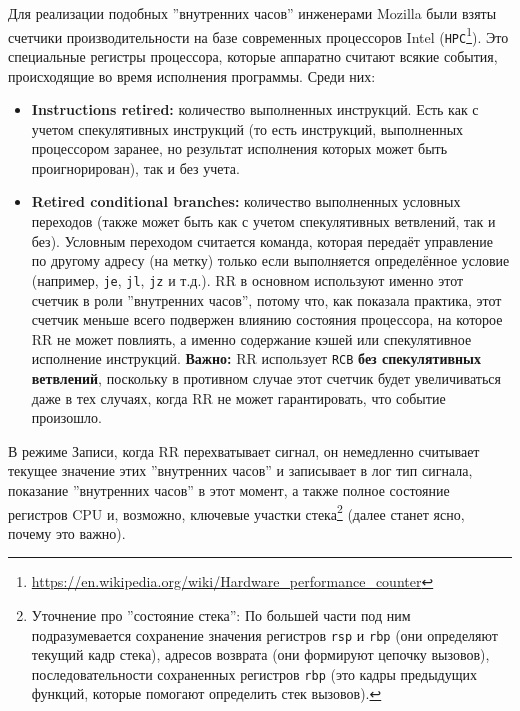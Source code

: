 Для реализации подобных ''внутренних часов'' инженерами Mozilla \cite{rr-paper}
были взяты счетчики производительности на базе современных процессоров Intel
(\texttt{HPC}\footnote{\url{https://en.wikipedia.org/wiki/Hardware_performance_counter}}).
Это специальные регистры процессора, которые аппаратно считают всякие события,
происходящие во время исполнения программы. Среди них:

\begin{itemize}

  \item \textbf{Instructions retired:} количество выполненных инструкций. Есть
  как с учетом спекулятивных инструкций (то есть инструкций, выполненных
  процессором заранее, но результат исполнения которых может быть
  проигнорирован), так и без учета.

  \item \textbf{Retired conditional branches:} количество выполненных условных
  переходов (также может быть как с учетом спекулятивных ветвлений, так и без).
  Условным переходом считается команда, которая передаёт управление по другому
  адресу (на метку) только если выполняется определённое условие (например,
  \texttt{je}, \texttt{jl}, \texttt{jz} и т.д.). RR в основном используют
  именно этот счетчик в роли ''внутренних часов'', потому что, как показала
  практика, этот счетчик меньше всего подвержен влиянию состояния процессора,
  на которое RR не может повлиять, а именно содержание кэшей или спекулятивное
  исполнение инструкций. \textbf{Важно:} RR использует \texttt{RCB} \textbf{без
  спекулятивных ветвлений}, поскольку в противном случае этот счетчик будет
  увеличиваться даже в тех случаях, когда RR не может гарантировать, что
  событие произошло.

\end{itemize}

В режиме Записи, когда RR перехватывает сигнал, он немедленно считывает текущее
значение этих ''внутренних часов'' и записывает в лог тип сигнала, показание
''внутренних часов'' в этот момент, а также полное состояние регистров CPU и,
возможно, ключевые участки стека\footnote{Уточнение про ''состояние стека'': По
большей части под ним подразумевается сохранение значения регистров
\texttt{rsp} и \texttt{rbp} (они определяют текущий кадр стека), адресов
возврата (они формируют цепочку вызовов), последовательности сохраненных
регистров \texttt{rbp} (это кадры предыдущих функций, которые помогают
определить стек вызовов).} (далее станет ясно, почему это важно).

